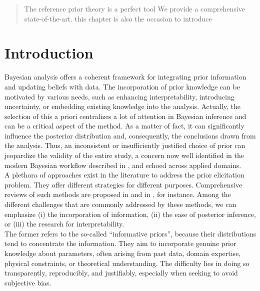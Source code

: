 

\begin{abstract}
    The reference prior theory is a perfect tool 
    We provide a comprehensive state-of-the-art. 
    this chapter is also the occasion to introduce 
\end{abstract}

\minitoc


\section{Introduction}\label{sec:intro-ref:intro}

Bayesian analysis offers a coherent framework for integrating prior information and updating beliefs with data. The incorporation of prior knowledge can be motivated by various needs, such as enhancing interpretability, introducing uncertainty, or embedding existing knowledge into the analysis. Actually, the selection of this a priori centralizes a lot of attention in Bayesian inference and can be a critical aspect of the method. As a matter of fact, it can significantly influence the posterior distribution and, consequently, the conclusions drawn from the analysis. Thus, an inconsistent or insufficiently justified choice of prior can jeopardize the validity of the entire study, a concern now well identified in the modern Bayesian workflow described in \cite{gelman_bayesian_2020}, and echoed across applied domains.\\

A plethora of approaches exist in the literature to address the prior elicitation problem. They offer different strategies for different purposes. 
Comprehensive reviews of such methods are proposed in \cite{mikkola_prior_2023}
and in \cite{consonni_prior_2018}, for instance.
Among the different challenges that are commonly addressed by these methods, we can emphasize (i) the incorporation of information, (ii) the ease of posterior inference, or (iii) the research for interpretability.\\
The former refers to the so-called ``informative priors'', because their distributions tend to concentrate the information. %
They aim to incorporate genuine prior knowledge about parameters, often arising from past data, domain expertise, physical constraints, or theoretical understanding. %
The difficulty lies in doing so transparently, reproducibly, and justifiably, especially when seeking to avoid subjective bias.

